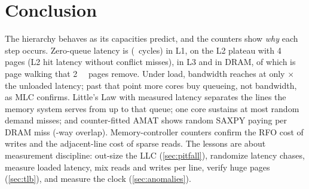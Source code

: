 \section{Conclusion}\label{sec:conclusion}

The hierarchy behaves as its capacities predict, and the counters show \emph{why} each step occurs.
Zero-queue latency is  (~cycles) in L1,
 on the L2 plateau with \qty{4}{\kibi\byte} pages (L2 hit latency
 without conflict misses),  in L3 and
 in DRAM, of which  is page walking
that \qty{2}{\mebi\byte} pages remove. Under load, bandwidth reaches 
at only $\times$ the unloaded latency; past that point more cores buy queueing, not
bandwidth, as MLC confirms. Little's Law with measured latency separates the  lines the
memory system serves from up to  that queue; one core sustains at most
 random demand misses; and counter-fitted AMAT shows random SAXPY paying
 per DRAM miss (-way overlap). Memory-controller
counters confirm the RFO cost of writes and the adjacent-line cost of sparse reads. The lessons are about
measurement discipline: out-size the LLC (\cref{sec:pitfall}), randomize latency chases, measure loaded
latency, mix reads and writes per line, verify huge pages (\cref{sec:tlb}), and measure the clock
(\cref{sec:anomalies}).
